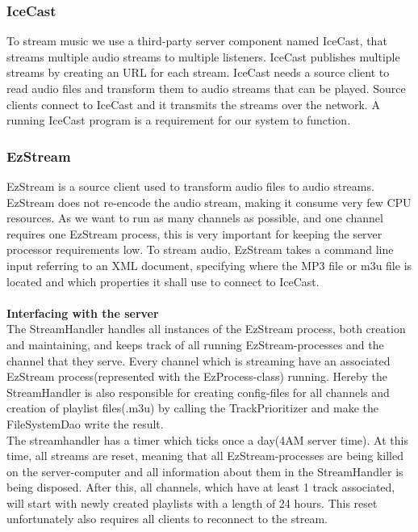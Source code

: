 \documentclass[a4paper,11pt,report]{article}
\begin{document}
\subsubsection{IceCast}
To stream music we use a third-party server component named IceCast\cite{IceCast}, that streams multiple audio streams to multiple listeners. IceCast publishes multiple streams by creating an URL for each stream. IceCast needs a source client to read audio files and transform them to audio streams that can be played. Source clients connect to IceCast and it transmits the streams over the network. A running IceCast program is a requirement for our system to function.
\subsubsection{EzStream}
EzStream\cite{EzStream} is a source client used to transform audio files to audio streams. EzStream does not re-encode the audio stream, making it consume very few CPU resources. As we want to run as many channels as possible, and one channel requires one EzStream process, this is very important for keeping the server processor requirements low. To stream audio, EzStream takes a command line input referring to an XML document, specifying where the MP3 file or m3u file is located and which properties it shall use to connect to IceCast. \\ \\
\textbf{Interfacing with the server} \\
The StreamHandler handles all instances of the EzStream process, both creation and maintaining, and keeps track of all running EzStream-processes and the channel that they serve. Every channel which is streaming have an associated EzStream process(represented with the EzProcess-class) running. Hereby the StreamHandler is also responsible for creating config-files for all channels and creation of playlist files(.m3u) by calling the TrackPrioritizer and make the FileSystemDao write the result. \\

The streamhandler has a timer which ticks once a day(4AM server time). At this time, all streams are reset, meaning that all EzStream-processes are being killed on the server-computer and all information about them in the StreamHandler is being disposed. After this, all channels, which have at least 1 track associated, will start with newly created playlists with a length of 24 hours. This reset unfortunately also requires all clients to reconnect to the stream. \\
\end{document}
